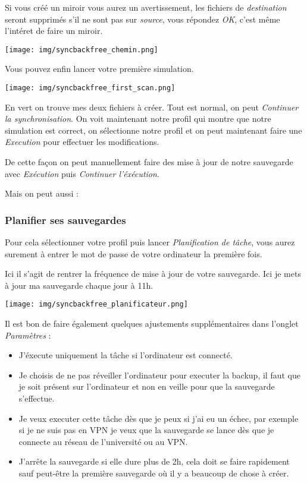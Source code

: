 \documentclass[
]{article}
\providecommand{\tightlist}{%
  \setlength{\itemsep}{0pt}\setlength{\parskip}{0pt}}
\begin{document}
Si vous créé un miroir vous aurez un avertissement, les fichiers de
\emph{destination} seront supprimés s'il ne sont pas sur \emph{source},
vous répondez \emph{OK}, c'est même l'intéret de faire un miroir.

\texttt{[image: img/syncbackfree\_chemin.png]}

Vous pouvez enfin lancer votre première simulation.

\texttt{[image: img/syncbackfree\_first\_scan.png]}

En vert on trouve mes deux fichiers à créer. Tout est normal, on peut
\emph{Continuer la synchronisation}. On voit maintenant notre profil qui
montre que notre simulation est correct, on sélectionne notre profil et
on peut maintenant faire une \emph{Execution} pour effectuer les
modifications.

De cette façon on peut manuellement faire des mise à jour de notre
sauvegarde avec \emph{Exécution} puis \emph{Continuer l'éxécution}.

Mais on peut aussi :

\subsubsection{Planifier ses sauvegardes
📆}\label{planifier-ses-sauvegardes}

Pour cela sélectionner votre profil puis lancer \emph{Planification de
tâche}, vous aurez surement à entrer le mot de passe de votre ordinateur
la première fois.

Ici il s'agit de rentrer la fréquence de mise à jour de votre
sauvegarde. Ici je mets à jour ma sauvegarde chaque jour à 11h.

\texttt{[image: img/syncbackfree\_planificateur.png]}

Il est bon de faire également quelques ajustements supplémentaires dans
l'onglet \emph{Paramètres} :

\begin{itemize}
\tightlist
\item
  J'éxecute uniquement la tâche si l'ordinateur est connecté.
\item
  Je choisis de ne pas réveiller l'ordinateur pour executer la backup,
  il faut que je soit présent sur l'ordinateur et non en veille pour que
  la sauvegarde s'effectue.
\item
  Je veux executer cette tâche dès que je peux si j'ai eu un échec, par
  exemple si je ne suis pas en VPN je veux que la sauvegarde se lance
  dès que je connecte au réseau de l'université ou au VPN.
\item
  J'arrête la sauvegarde si elle dure plus de 2h, cela doit se faire
  rapidement sauf peut-être la première sauvegarde où il y a beaucoup de
  chose à créer.
\end{itemize}
\end{document}
